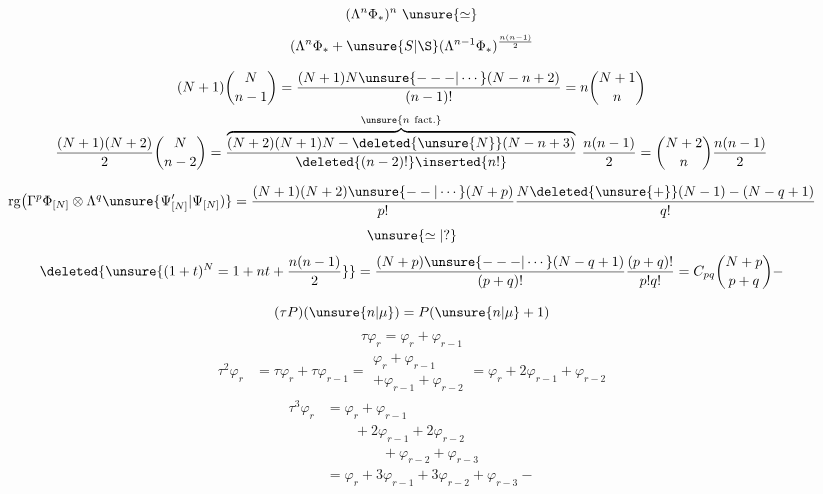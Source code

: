 
\[
(\Lambda^n\Phi_*)^n\ \unsure{\simeq}
\]
\[
(\Lambda^n\Phi_*+\unsure{S|\S}(\Lambda^{n-1}\Phi_*)^{\frac{n(n-1)}2}
\]

\[
(N+1)\binom{N}{n-1}
=\frac{(N+1)N\unsure{---|\cdots}(N-n+2)}{(n-1)!}
=n\binom{N+1}{n}
\]
\[
\frac{(N+1)(N+2)}2\binom{N}{n-2}
=\frac{\overbrace{(N+2)(N+1)N-\deleted{\unsure{N}}(N-n+3)}^{\unsure{n\ \text{fact.}}}}
{\deleted{(n-2)!}\inserted{n!}}\ \frac{n(n-1)}2
=\binom{N+2}{n}\frac{n(n-1)}2
\]

\[
\operatorname{rg}\bigl(\Gamma^p\Phi_{[N]}\otimes\Lambda^q\unsure{\Psi_{[N]}'|\Psi_{[N]})}
=\frac{(N+1)(N+2)\unsure{--|\cdots}(N+p)}{p!}
\frac{N\deleted{\unsure{+}}(N-1)-(N-q+1)}{q!}
\]
\[
\unsure{\simeq|?}
\]
\[
\deleted{\unsure{(1+t)^N=1+nt+\frac{n(n-1)}2}}
=\frac{(N+p)\unsure{---|\cdots}(N-q+1)}{(p+q)!}\frac{(p+q)!}{p!q!}
=C_{pq}\binom{N+p}{p+q}-
\]

\[
(\tau P)(\unsure{n|\mu})=P(\unsure{n|\mu}+1)
\]
\[
\tau\varphi_r=\varphi_r+\varphi_{r-1}
\]
\[
\begin{aligned}
\tau^2\varphi_r&=\tau\varphi_r+\tau\varphi_{r-1}
=\begin{gathered}\varphi_r+\varphi_{r-1}\\+\varphi_{r-1}+\varphi_{r-2}\end{gathered}
=\varphi_r+2\varphi_{r-1}+\varphi_{r-2}
\end{aligned}
\]
\[
\begin{aligned}
\tau^3\varphi_r&=\varphi_r+\varphi_{r-1}\\
&\qquad+2\varphi_{r-1}+2\varphi_{r-2}\\
&\qquad\qquad+\varphi_{r-2}+\varphi_{r-3}\\
&=\varphi_r+3\varphi_{r-1}+3\varphi_{r-2}+\varphi_{r-3}-
\end{aligned}
\]

